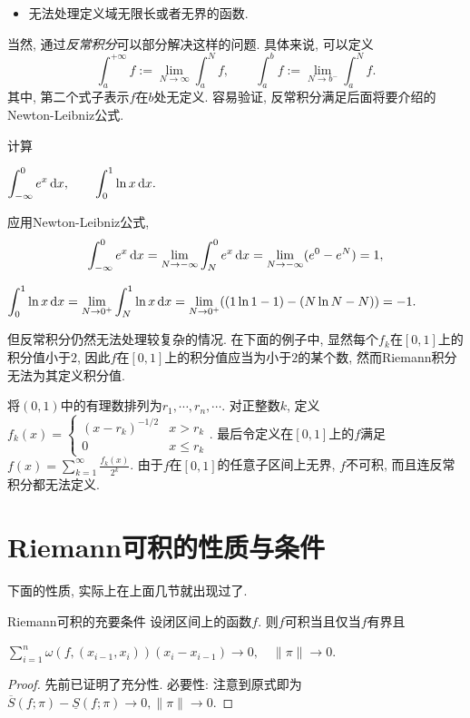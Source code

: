 \begin{itemize}
	\item 无法处理定义域无限长或者无界的函数. 
\end{itemize}

当然, 通过\textit{反常积分}可以部分解决这样的问题. 具体来说, 可以定义$$\int_{a}^{+\infty} f := \lim_{N\to \infty} \int_{a}^{N} f,\qquad \int_{a}^{b} f:= \lim_{N \to b^-} \int_{a}^{N} f.$$
其中, 第二个式子表示$f$在$b$处无定义. 容易验证, 反常积分满足后面将要介绍的Newton-Leibniz公式. 

\begin{example}
	计算
	\begin{center}
		$\displaystyle \int_{-\infty}^{0} e^x \mathop{}\!\mathrm{d} x,\qquad \int_{0}^{1} \ln x \mathop{}\!\mathrm{d} x.$
	\end{center}
\end{example}
\begin{solution}
	应用Newton-Leibniz公式, $$\int_{-\infty}^{0} e^x \mathop{}\!\mathrm{d} x = \lim_{N\to -\infty} \int_{N}^{0} e^x \mathop{}\!\mathrm{d} x = \lim_{N\to -\infty} (e^0-e^N)=1,$$
	\begin{center}
		$\displaystyle \int_{0}^{1} \ln x \mathop{}\!\mathrm{d} x = \lim_{N\to 0^+} \int_{N}^{1} \ln x \mathop{}\!\mathrm{d} x = \lim_{N\to 0^+}((1\ln 1-1)-(N\ln N-N))=-1.$
	\end{center}
\end{solution}

但反常积分仍然无法处理较复杂的情况. 在下面的例子中, 显然每个$f_k$在$[0,1]$上的积分值小于$2$, 因此$f$在$[0,1]$上的积分值应当为小于$2$的某个数, 然而Riemann积分无法为其定义积分值. 

\begin{example}
	将$(0,1)$中的有理数排列为$r_1,\cdots ,r_n,\cdots$. 对正整数$k$, 定义$f_k(x)=\begin{cases}
		(x-r_k)^{-1/2} & x>r_k \\ 0 & x \leq r_k
	\end{cases}$. 最后令定义在$[0,1]$上的$f$满足$\displaystyle f(x)=\sum_{k=1}^{\infty} \frac{f_k(x)}{2^k}$. 由于$f$在$[0,1]$的任意子区间上无界, $f$不可积, 而且连反常积分都无法定义. 
\end{example}


\newpage
\section{Riemann可积的性质与条件}

下面的性质, 实际上在上面几节就出现过了. 

\begin{proposition}{Riemann可积的充要条件} \label{pro:kejiisyc}
	设闭区间上的函数$f$. 则$f$可积当且仅当$f$有界且
	\begin{center}
		$\displaystyle \sum_{i=1}^{n} \omega (f,(x_{i-1},x_i)) (x_i-x_{i-1}) \to 0,\quad \| \pi \| \to 0.$
	\end{center}
\end{proposition}
\begin{proof}
	先前已证明了充分性. 必要性: 注意到原式即为$\overline{S}(f;\pi) - \underline{S}(f;\pi) \to 0,\| \pi \| \to 0$. 
\end{proof}

